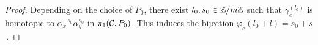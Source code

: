 \documentclass[main.tex]{subfiles}
\begin{document}
\begin{proof}
  Depending on the choice of $P_0$, there exist $l_0, s_0 \in \mathbb{Z}/m\mathbb{Z}$ such that $\gamma_e^{(l_0)}$ is homotopic to $\alpha_x^{-s_0} \alpha_y^{s_0}$ in $\pi_1(\mathcal{C},P_0)$. This induces the bijection
  $\varphi_e(l_0+l) = s_0+s$\,. 
  \end{proof}


  
  
  
\end{document}
